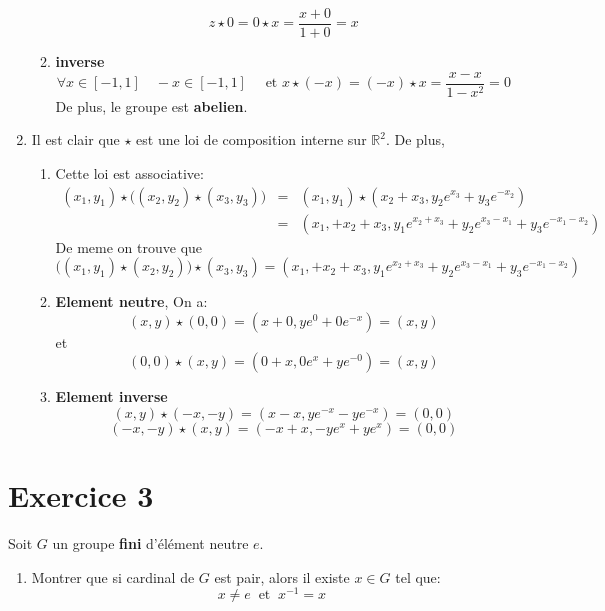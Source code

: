 \documentclass{report}
\begin{document}
\begin{myproof}
\begin{enumerate}
\begin{enumerate}
          $$
          z \star 0  = 0 \star x = \dfrac{x + 0}{ 1 + 0} = x
          $$
          \item \textbf{inverse} 
            $$
            \forall x\in [-1,1] \quad -x \in [-1,1] \quad \text{ et } x \star (-x) = (-x)\star x = \dfrac{x - x}{ 1 - x^2} = 0
            $$
            De plus, le groupe est \textbf{abelien}.
      \end{enumerate}
    \item Il est clair que $\star$ est une loi de composition interne sur $\mathbb{R}^2$. De plus, 

      \begin{enumerate}
        \item Cette loi est associative:
          \begin{eqnarray}
            (x_1,y_1)\star \big(\left(x_2,y_2\right)\star \left(x_3, y_3\right)\big) &=& (x_1, y_1)\star \left(x_2 + x_3, y_2 e^{x_3} + y_3 e^{-x_2}\right)\\
                                                                                     &=& (x_1, + x_2 + x_3, y_1e^{x_2+ x_3}+ y_2e^{x_3-x_1} + y_3e^{-x_1-x_2})
          \end{eqnarray}
          De meme  on trouve que
          $$
          \big((x_1,y_1)\star \left(x_2,y_2\right)\big) \star \left(x_3, y_3\right) = (x_1, + x_2 + x_3, y_1e^{x_2+ x_3}+ y_2e^{x_3-x_1} + y_3e^{-x_1-x_2})
          $$
        \item \textbf{Element neutre}, On a:
          $$
          (x,y) \star (0,0) = (x + 0, ye^0 + 0 e^{-x}) = (x,y)
          $$
          et 
          $$
          (0,0)\star (x,y) = (0 + x, 0e^x + ye^{-0}) = (x,y)
          $$
        \item \textbf{Element inverse} 
          $$
          (x,y) \star (-x, -y) = (x -x, ye^{-x}- ye^{-x}) = (0,0)
          $$
          $$
          (-x,-y)\star (x,y) = (-x+x, -ye^{x} + ye^{x}) = (0,0)
          $$

      \end{enumerate}
  \end{enumerate}
\end{myproof}

\section{Exercice 3}
\qs{}
{
Soit $G$ un groupe \textbf{fini} d'élément neutre $e$.\\
\begin{enumerate}
  \item 
Montrer que si cardinal de $G$ est pair, alors il existe $x\in G$ tel que:
$$x\neq
e\;\;\text{et}\;\; x^{-1} = x$$
\end{enumerate}

}
\end{document}
